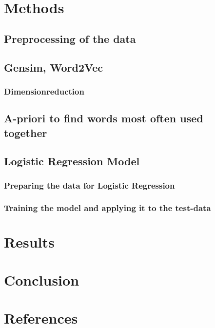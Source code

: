 \documentclass[11pt,a4paper]{article}
\begin{document}
\section{Methods}
\subsection{Preprocessing of the data}
\subsection{Gensim, Word2Vec}
\subsubsection{Dimensionreduction}
\subsection{A-priori to find words most often used together}
\subsection{Logistic Regression Model}
\subsubsection{Preparing the data for Logistic Regression}

\subsubsection{Training the model and applying it to the test-data}

\section{Results}
\section{Conclusion}
\section{References}
\end{document}

